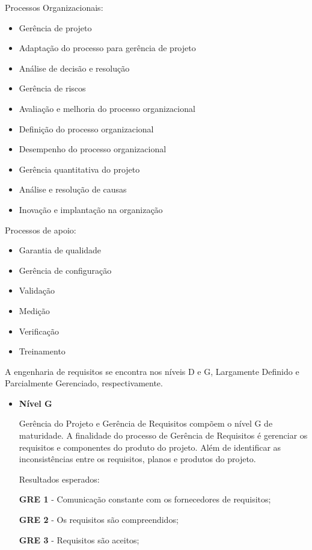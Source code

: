 \begin{itemize}
Processos Organizacionais:

\begin{itemize}
\item Gerência de projeto
\item Adaptação do processo para gerência de projeto
\item Análise de decisão e resolução
\item Gerência de riscos
\item Avaliação e melhoria do processo organizacional
\item Definição do processo organizacional
\item Desempenho do processo organizacional
\item Gerência quantitativa do projeto
\item Análise e resolução de causas
\item Inovação e implantação na organização
\end{itemize}

Processos de apoio:

\begin{itemize}
\item Garantia de qualidade
\item Gerência de configuração
\item Validação
\item Medição
\item Verificação
\item Treinamento
\end{itemize}

A engenharia de requisitos se encontra nos níveis D e G, Largamente Definido e Parcialmente Gerenciado, respectivamente.

\begin{itemize}
\item\textbf{Nível G}

Gerência do Projeto e Gerência de Requisitos compõem o nível G de maturidade.
A finalidade do processo de Gerência de Requisitos é gerenciar os requisitos e componentes do produto do projeto. Além de identificar as inconsistências entre os requisitos, planos e produtos do projeto. \cite {softex}

Resultados esperados:

\textbf{GRE 1} - Comunicação constante com os fornecedores de requisitos;

\textbf{GRE 2} - Os requisitos são compreendidos;

\textbf{GRE 3} - Requisitos são aceitos;


\end{itemize}
\end{itemize}
